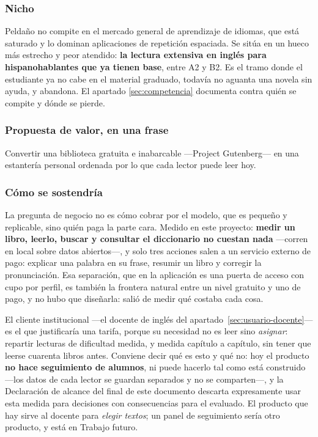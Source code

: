 \documentclass[11pt,a4paper]{article}
\begin{document}
\subsubsection*{Nicho}

Peldaño no compite en el mercado general de aprendizaje de idiomas, que está saturado y
lo dominan aplicaciones de repetición espaciada. Se sitúa en un hueco más estrecho y
peor atendido: \textbf{la lectura extensiva en inglés para hispanohablantes que ya
tienen base}, entre A2 y B2. Es el tramo donde el estudiante ya no cabe en el material
graduado, todavía no aguanta una novela sin ayuda, y abandona. El apartado
\ref{sec:competencia} documenta contra quién se compite y dónde se pierde.

\subsubsection*{Propuesta de valor, en una frase}

Convertir una biblioteca gratuita e inabarcable —Project Gutenberg— en una estantería
personal ordenada por lo que cada lector puede leer hoy.

\subsubsection*{Cómo se sostendría}

La pregunta de negocio no es cómo cobrar por el modelo, que es pequeño y replicable,
sino quién paga la parte cara. Medido en este proyecto: \textbf{medir un libro, leerlo,
buscar y consultar el diccionario no cuestan nada} —corren en local sobre datos
abiertos—, y solo tres acciones salen a un servicio externo de pago: explicar una
palabra en su frase, resumir un libro y corregir la pronunciación. Esa separación, que
en la aplicación es una puerta de acceso con cupo por perfil, es también la frontera
natural entre un nivel gratuito y uno de pago, y no hubo que diseñarla: salió de medir
qué costaba cada cosa.

El cliente institucional —el docente de inglés del
apartado~\ref{sec:usuario-docente}— es el que justificaría una tarifa, porque su
necesidad no es leer sino \emph{asignar}: repartir lecturas de dificultad medida, y
medida capítulo a capítulo, sin tener que leerse cuarenta libros antes. Conviene decir
qué es esto y qué no: hoy el producto \textbf{no hace seguimiento de alumnos}, ni puede
hacerlo tal como está construido —los datos de cada lector se guardan separados y no se
comparten—, y la Declaración de alcance del final de este documento descarta
expresamente usar esta medida para decisiones con consecuencias para el evaluado. El
producto que hay sirve al docente para \emph{elegir textos}; un panel de seguimiento
sería otro producto, y está en Trabajo futuro.
\end{document}
